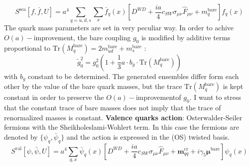 \documentclass[english, LaM, oneside, noexaminfo]{sapthesis}
\newcommand{\bare}{^{\text{bare}}}
\newcommand{\oait}{$O(a)-$improvement}
\newcommand{\tr}{\text{Tr}}
\begin{document}
\begin{equation}\label{eq:sea-action}
    S^{\text{sea}}[f, \bar f, U] = a^4 \sum_{q=u,d,s} \sum_{x} \bar f_q (x) \left[ D^{WD} + \frac{ia}{4}c_{SW}\sigma_{\mu\nu}\hat F_{\mu\nu} + m_q\bare \right] f_q (x)
\end{equation}
The quark mass parameters are set in very peculiar way.
In order to achive \oait, the bare coupling $g_0$ is modified by additive terms proportional to $\tr (M_q\bare) = 2m_{ud}\bare + m_s\bare$ \cite{scale_CLS_opt1}:
\begin{equation*}
    \tilde{g}_0^2 = g_0^2 \left( 1+\frac{1}{3}a\cdot b_g \cdot \tr (M_q\bare) \right)
\end{equation*}
with $b_g$ constant to be determined.
The generated ensembles differ form each other by the value of the bare quark masses, but the trace $\tr (M_q\bare)$ is kept constant in order to preserve the \oait\space of $g_0$.
I want to stress that the constant trace of bare masses does not imply that the trace of renormalized masses is constant.
\newline\newline
{\bf Valence quarks action}: Osterwalder-Seiler fermions with the Sheikholeslami-Wohlert term.
In this case the fermions are denoted by $\{\psi_q, \bar\psi_q\}$ and the action is expressed in the (OS) twisted basis.
\begin{equation}\label{eq:valence-action}
    S^{\text{val}}[\psi, \bar\psi, U] = a^4 \sum_{q,x} \bar \psi_q (x) \left[ D^{WD} + \frac{ia}{4}c_{SW}\sigma_{\mu\nu}\hat F_{\mu\nu} + \boldsymbol{m}^\text{cr}_{qq} + i\gamma_5\boldsymbol{\mu}\bare \right] \psi_q (x)
\end{equation}
\end{document}
